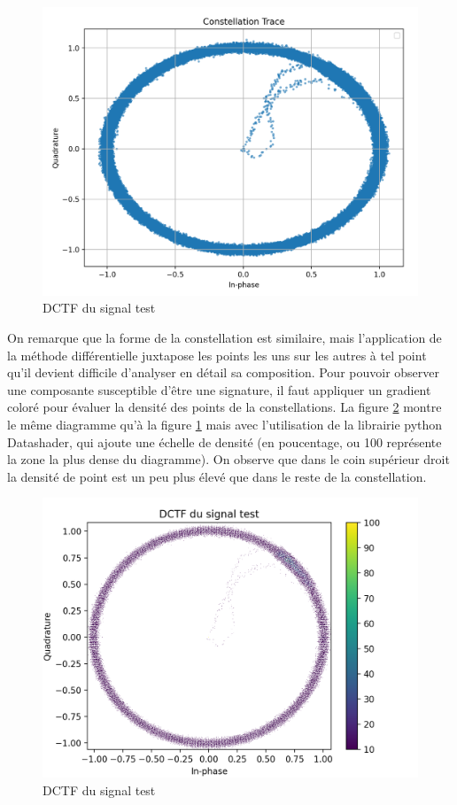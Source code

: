 \begin{figure}[h]
\centering

\includegraphics[scale=0.25]{images/dctf3.png}
\caption{DCTF du signal test}\label{term316}
\end{figure}

On remarque que la forme de la constellation est similaire, mais l'application de la méthode différentielle juxtapose les points les uns sur les autres à tel point qu'il devient difficile d'analyser en détail sa composition. Pour pouvoir observer une composante susceptible d'être une signature, il faut appliquer un gradient coloré pour évaluer la densité des points de la constellations. La figure \ref{term317} montre le même diagramme qu'à la figure \ref{term316} mais avec l'utilisation de la librairie python Datashader, qui ajoute une échelle de densité (en poucentage, ou 100 représente la zone la plus dense du diagramme). On observe que dans le coin supérieur droit la densité de point est un peu plus élevé que dans le reste de la constellation.

\begin{figure}[h]
\centering

\includegraphics[scale=0.3]{images/dctf4.png}
\caption{DCTF du signal test}\label{term317}
\end{figure}

